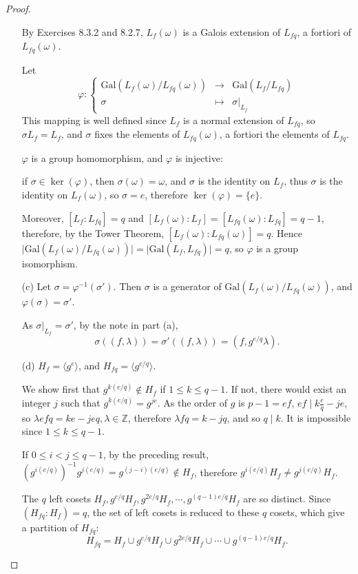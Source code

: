 \documentclass[11pt,a4paper]{article}
\newcommand{\Z}{\mathbb{Z}}
\newcommand{\Gal}{\mathrm{Gal}}
\begin{document}
\begin{proof}
\begin{enumerate}
By Exercises 8.3.2 and 8.2.7, $L_f(\omega)$ is a Galois extension of $L_{fq}$, a fortiori of $L_{fq}(\omega)$.

Let 
$$
\varphi : 
\left\{
\begin{array}{ccc}
 \Gal(L_f(\omega)/L_{fq}(\omega)) & \to   & \Gal(L_f/L_{fq})  \\
  \sigma &  \mapsto &  \sigma \vert_{L_f}
\end{array}
\right.
$$
This mapping is well defined since $L_f$ is a normal extension of $L_{fq}$, so $\sigma L_f =L_f$, and $\sigma$ fixes the elements of $L_{fq}(\omega)$, a fortiori the elements of $L_{fq}$.

$\varphi$ is a group homomorphism, and $\varphi$ is injective: 

if $\sigma \in \ker(\varphi)$, then $\sigma(\omega) = \omega$, and $\sigma$ is the identity on $L_f$, thus $\sigma$ is the identity on $L_f(\omega)$, so $\sigma = e$, therefore $\ker(\varphi) = \{e\}$.

Moreover, $[L_f:L_{fq}] = q$ and $[L_f(\omega):L_f] = [L_{fq}(\omega) : L_{fq}] = q-1$, therefore, by the Tower Theorem, $[L_f(\omega):L_{fq}(\omega)] = q$.
Hence $\vert  \Gal(L_f(\omega)/L_{fq}(\omega)) \vert = \vert \Gal(L_f,L_{fq}) \vert = q$, so $\varphi$ is a group isomorphism.

\item[(c)] Let $\sigma = \varphi^{-1}(\sigma')$. Then $\sigma$ is a generator of $\Gal(L_f(\omega)/L_{fq}(\omega))$, and $\varphi(\sigma) = \sigma'$.

As $\sigma\vert _{L_f} = \sigma'$, by the note in part (a),
$$\sigma((f,\lambda)) =  \sigma'((f,\lambda)) = (f,g^{e/q} \lambda).$$


\item[(d)] $H_f = \langle g^e \rangle$, and $H_{fq} = \langle g^{e/q} \rangle$.

We show first that $g^{k(e/q)} \not \in H_f$ if $1 \leq k \leq  q-1$. If not, there would exist an integer $j$ such that $g^{k(e/q)} = g^{je}$. As the order of $g$ is $p-1=ef$, $ef \mid k \frac{e}{q} - je$, so $\lambda e f q = ke -jeq ,\lambda \in \Z$, therefore $\lambda f q = k -jq$, and so $q \mid k$. It is impossible since $1 \leq k \leq  q-1$.

If $0 \leq i < j \leq q-1$, by the preceding result, $(g^{i(e/q)})^{-1} g^{j(e/q)} = g^{(j-i)(e/q)}  \not \in H_f$, therefore  $g^{i(e/q)} H_f \neq g^{j(e/q)}H_f$.

The $q$ left cosets $H_f,g^{e/q} H_f,g^{2e/q} H_f,\cdots,g^{(q-1)e/q} H_f$ are so distinct. Since $(H_{fq} : H_f) = q$, the set of left cosets is reduced to these $q$ cosets, which give a partition of $H_{fq}$:
$$H_{fq} = H_f \cup g^{e/q} H_f \cup g^{2e/q} H_f \cup \cdots \cup g^{(q-1)e/q} H_f.$$
\end{enumerate}
\end{proof}
\end{document}
